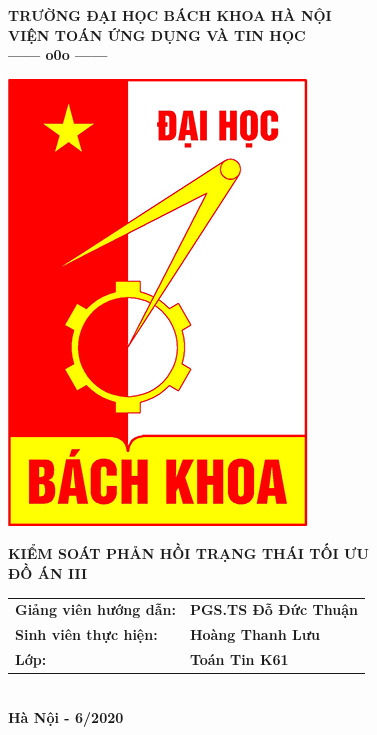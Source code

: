 \documentclass[12pt,a4paper]{report}
\begin{document}
	\thisfancypage{%
	\setlength{\fboxsep}{0pt}%
	\fbox}{} %
\thispagestyle{empty}
\begin{center}
	\vspace*{0.4cm}
	\fontsize{14}{12}
	\textbf{TRƯỜNG ĐẠI HỌC BÁCH KHOA HÀ NỘI}\\
	\textbf{VIỆN TOÁN ỨNG DỤNG VÀ TIN HỌC}\\
	\textbf{------ o0o ------}
\end{center}
\vspace*{0.8cm}
\begin{center}
	\includegraphics[scale=.5]{bk.png}
\end{center}
\vspace*{0.8cm}
\begin{center}
	\fontsize{20}{18}
	\textbf{KIỂM SOÁT PHẢN HỒI TRẠNG THÁI TỐI ƯU}\\
	\vspace*{0.8cm}
	\fontsize{18}{16}
	\textbf{ĐỒ ÁN III}
\end{center}
\vspace*{0.7cm}
\begin{center}
	\fontsize{14}{16}
	\begin{tabular}{ll}
		
		\textbf{Giảng viên hướng dẫn:} & \textbf{PGS.TS Đỗ Đức Thuận} \\ 
		\textbf{Sinh viên thực hiện:} & \textbf{Hoàng Thanh Lưu} \\ 
		\textbf{Lớp:}  & \textbf{Toán Tin K61} \\ 
	\end{tabular} \\
	\vspace*{2.5cm}
	\fontsize{14}{16}
	\textbf{Hà Nội - 6/2020}
\end{center}
\end{document}
